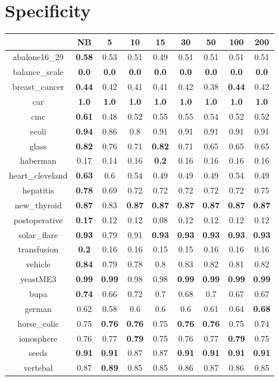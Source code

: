 \documentclass{article}%
\begin{document}
%
\section*{Specificity}%
\begin{tabular}{c|cccccccc}%
\hline%
&NB&5&10&15&30&50&100&200\\%
\hline%
abalone16\_29&\textbf{0.58}&0.53&0.51&0.49&0.51&0.51&0.51&0.51\\%
\hline%
balance\_scale&\textbf{0.0}&\textbf{0.0}&\textbf{0.0}&\textbf{0.0}&\textbf{0.0}&\textbf{0.0}&\textbf{0.0}&\textbf{0.0}\\%
\hline%
breast\_cancer&\textbf{0.44}&0.42&0.41&0.41&0.42&0.38&\textbf{0.44}&0.42\\%
\hline%
car&\textbf{1.0}&\textbf{1.0}&\textbf{1.0}&\textbf{1.0}&\textbf{1.0}&\textbf{1.0}&\textbf{1.0}&\textbf{1.0}\\%
\hline%
cmc&\textbf{0.61}&0.48&0.52&0.55&0.55&0.54&0.52&0.52\\%
\hline%
ecoli&\textbf{0.94}&0.86&0.8&0.91&0.91&0.91&0.91&0.91\\%
\hline%
glass&\textbf{0.82}&0.76&0.71&\textbf{0.82}&0.71&0.65&0.65&0.65\\%
\hline%
haberman&0.17&0.14&0.16&\textbf{0.2}&0.16&0.16&0.16&0.16\\%
\hline%
heart\_cleveland&\textbf{0.63}&0.6&0.54&0.49&0.49&0.49&0.54&0.49\\%
\hline%
hepatitis&\textbf{0.78}&0.69&0.72&0.72&0.72&0.72&0.72&0.75\\%
\hline%
new\_thyroid&\textbf{0.87}&0.83&\textbf{0.87}&\textbf{0.87}&\textbf{0.87}&\textbf{0.87}&\textbf{0.87}&\textbf{0.87}\\%
\hline%
postoperative&\textbf{0.17}&0.12&0.12&0.08&0.12&0.12&0.12&0.12\\%
\hline%
solar\_flare&\textbf{0.93}&0.79&0.91&\textbf{0.93}&\textbf{0.93}&\textbf{0.93}&\textbf{0.93}&\textbf{0.93}\\%
\hline%
transfusion&\textbf{0.2}&0.16&0.16&0.15&0.15&0.16&0.16&0.16\\%
\hline%
vehicle&\textbf{0.84}&0.79&0.78&0.8&0.83&0.82&0.81&0.82\\%
\hline%
yeastME3&\textbf{0.99}&\textbf{0.99}&0.98&0.98&\textbf{0.99}&\textbf{0.99}&\textbf{0.99}&\textbf{0.99}\\%
\hline%
bupa&\textbf{0.74}&0.66&0.72&0.7&0.68&0.7&0.67&0.67\\%
\hline%
german&0.62&0.58&0.6&0.6&0.6&0.61&0.64&\textbf{0.68}\\%
\hline%
horse\_colic&0.75&\textbf{0.76}&\textbf{0.76}&0.75&\textbf{0.76}&\textbf{0.76}&0.75&0.74\\%
\hline%
ionosphere&0.76&0.77&\textbf{0.79}&0.75&0.76&0.77&\textbf{0.79}&0.75\\%
\hline%
seeds&\textbf{0.91}&\textbf{0.91}&0.87&0.87&\textbf{0.91}&\textbf{0.91}&\textbf{0.91}&\textbf{0.91}\\%
\hline%
vertebal&0.87&\textbf{0.89}&0.85&0.85&0.86&0.87&0.86&0.85\\%
\hline%
\end{tabular}
\end{document}
